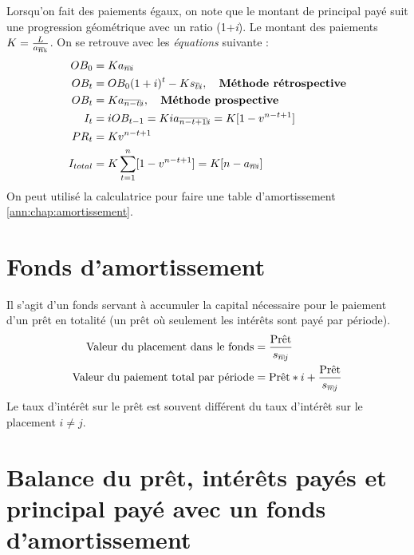 \documentclass[11pt,french]{report}
\makeatletter
\DeclareRobustCommand{\annuity}[1]{%
\def\arraystretch{0}%
\setlength\arraycolsep{.7pt}%
\setlength\arrayrulewidth{.3pt}%
\begin{array}[b]{@{}c|}\hline
\\[\arraycolsep]%
\scriptstyle #1%
\end{array}%
}
\makeatother
\begin{document}
Lorsqu'on fait des paiements égaux, on note que le montant de principal payé suit une progression géométrique avec un ratio (1+\textit{i}). Le montant des paiements $K = \frac{L}{a_{\annuity{n}i}}$. On se retrouve avec les \emph{équations} suivante :
\begin{align*}
OB_0 & = Ka_{\annuity{n}i} \\
OB_t & = OB_0(1+i)^t - Ks_{\annuity{t}i}, \quad \text{\textbf{Méthode rétrospective}} \\
OB_t & = Ka_{\annuity{n-t}i}, \quad \text{\textbf{Méthode prospective}} \\
I_t & = iOB_{t-1}= Kia_{\annuity{n-t+1}i} = K[1- v^{n-t + 1}] \\
PR_t & = Kv^{n-t+1} \\
I_{total} & = K \sum_{t=1}^{n}[1 -v^{n-t + 1}] = K[n -a_{\annuity{n}i}] \\
\end{align*}
On peut utilisé la calculatrice pour faire une table d'amortissement \ref{ann:chap:amortissement}.

\section{Fonds d'amortissement}
\label{sec:sinking fund}
Il s'agit d'un fonds servant à accumuler la capital nécessaire pour le paiement d'un prêt en totalité (un prêt où seulement les intérêts sont payé par période).
\begin{align*}
\text{Valeur du placement dans le fonds} & = \frac{\text{Prêt}}{s_{\annuity{n}j}} \\
\text{Valeur du paiement total par période} & = \text{Prêt}*i + \frac{\text{Prêt}}{s_{\annuity{n}j}}
\end{align*}
Le taux d'intérêt sur le prêt est souvent différent du taux d'intérêt sur le placement $ i \neq j$.

\section{Balance du prêt, intérêts payés et principal payé avec un fonds d'amortissement}
\label{sec: OB, PR, I from sinking fund}
\end{document}
